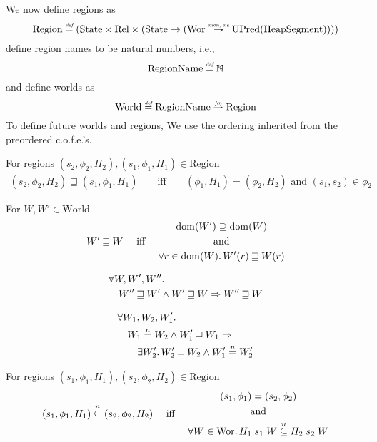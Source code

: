 \documentclass{article}
\newcommand{\finparfun}{\stackrel{\textit{\tiny{fin}}}{\rightharpoonup}}
\newcommand{\monnefun}{\stackrel{\textit{\tiny{mon, ne}}}{\rightarrow}}
\newcommand{\fun}{\rightarrow}
\newcommand{\defeq}{\stackrel{\textit{\tiny{def}}}{=}}
\newcommand{\nequal}[1][n]{\stackrel{\tiny{#1}}{=}}
\newcommand{\nsubeq}[1][n]{\stackrel{\tiny{#1}}{\subseteq}}
\DeclareMathOperator{\dom}{dom}
\newcommand{\cofe}{c.o.f.e.}
\newcommand{\cofes}{\cofe{}'s}
\newcommand{\future}{\mathbin{\sqsupseteq}}
\newcommand{\plaindom}[1]{\mathrm{#1}}
\newcommand{\HeapSegments}{\plaindom{HeapSegment}}
\newcommand{\nats}{\mathbb{N}}
\newcommand{\Rel}{\plaindom{Rel}}
\newcommand{\States}{\plaindom{State}}
\newcommand{\RegionNames}{\plaindom{RegionName}}
\newcommand{\Regions}{\plaindom{Region}}
\newcommand{\Worlds}{\plaindom{World}}
\newcommand{\Wor}{\plaindom{Wor}}
\newcommand{\UPred}[1]{\plaindom{UPred}(#1)}
\begin{document}
We now define regions as
\[
\Regions \defeq (\States \times \Rel \times (\States \fun (\Wor \monnefun \UPred{\HeapSegments})))
\]
define region names to be natural numbers, i.e.,
\[
  \RegionNames \defeq \nats
\]
and define worlds as
\[
\Worlds \defeq \RegionNames \finparfun \Regions
\]
To define future worlds and regions, We use the ordering inherited from the preordered \cofes{}.
\begin{definition}
For regions $(s_2,\phi_2,H_2), (s_1,\phi_1,H_1) \in \Regions$
  \begin{align*}
 (s_2,\phi_2,H_2) \future (s_1,\phi_1,H_1) &&\text{ iff } & &
(\phi_1,H_1) = (\phi_2,H_2) \text{ and } (s_1,s_2) \in \phi_2
  \end{align*}
\end{definition}

\begin{definition}
  For $W, W' \in \Worlds$
 \begin{align*}
 W' \future W & & \text{ iff } & &
   \begin{gathered}
     \dom(W') \supseteq \dom(W)\\ 
     \text{ and } \\
     \forall r \in \dom(W) \ldotp W'(r) \future W(r)
   \end{gathered}
 \end{align*}
\end{definition}

\begin{lemma}
\label{lem:future-worlds-trans}
  \begin{align*}
    & \forall W, W', W'' \ldotp \\
    & \quad  W'' \future W' \land W' \future W \Rightarrow W'' \future W
  \end{align*}
\end{lemma}

\begin{lemma}
\label{lem:nequal-and-future-world}
  \begin{align*}
    & \forall W_1,W_2,W_1' \ldotp \\
    & \quad W_1 \nequal W_2 \land W_1' \future W_1 \Rightarrow \\
    & \qquad \exists W_2' \ldotp W_2' \future W_2 \land W_1' \nequal W_2'
  \end{align*}
\end{lemma}

\begin{definition}
For regions $(s_1,\phi_1,H_1), (s_2,\phi_2,H_2) \in \Regions$
\begin{align*}
  (s_1,\phi_1,H_1) \nsubeq (s_2,\phi_2,H_2) & & \text{ iff } & &
  \begin{gathered}
    (s_1,\phi_1) = (s_2,\phi_2)\\
    \text{ and }\\
    \forall W \in \Wor \ldotp H_1 \; s_1 \; W \nsubeq H_2 \; s_2 \; W
  \end{gathered}
\end{align*}
\end{definition}
\end{document}
